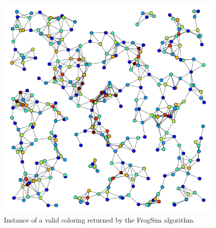 \documentclass[letterpaper]{article}
\begin{document}
\begin{figure}[h]
\centering
\includegraphics[scale=0.55]{./Figures/geo-coloried.pdf}
\caption{Instance of a valid coloring returned by the FrogSim algorithm.} \label{fig:GeoColoried}
\end{figure}
\end{document}
